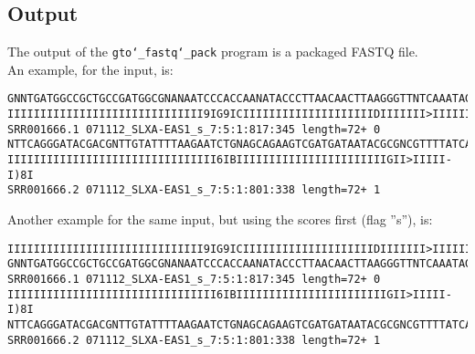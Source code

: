 \subsection*{Output}
The output of the \texttt{gto\char`_fastq\char`_pack} program is a packaged FASTQ file.\\
An example, for the input, is:
\begin{lstlisting}
GNNTGATGGCCGCTGCCGATGGCGNANAATCCCACCAANATACCCTTAACAACTTAAGGGTTNTCAAATAGA
IIIIIIIIIIIIIIIIIIIIIIIIIIIIII9IG9ICIIIIIIIIIIIIIIIIIIIIDIIIIIII>IIIIII/
SRR001666.1 071112_SLXA-EAS1_s_7:5:1:817:345 length=72+	0
NTTCAGGGATACGACGNTTGTATTTTAAGAATCTGNAGCAGAAGTCGATGATAATACGCGNCGTTTTATCAN
IIIIIIIIIIIIIIIIIIIIIIIIIIIIIIII6IBIIIIIIIIIIIIIIIIIIIIIIIGII>IIIII-I)8I
SRR001666.2 071112_SLXA-EAS1_s_7:5:1:801:338 length=72+	1
\end{lstlisting}
Another example for the same input, but using the scores first (flag ''s''), is:
\begin{lstlisting}
IIIIIIIIIIIIIIIIIIIIIIIIIIIIII9IG9ICIIIIIIIIIIIIIIIIIIIIDIIIIIII>IIIIII/
GNNTGATGGCCGCTGCCGATGGCGNANAATCCCACCAANATACCCTTAACAACTTAAGGGTTNTCAAATAGA
SRR001666.1 071112_SLXA-EAS1_s_7:5:1:817:345 length=72+	0
IIIIIIIIIIIIIIIIIIIIIIIIIIIIIIII6IBIIIIIIIIIIIIIIIIIIIIIIIGII>IIIII-I)8I
NTTCAGGGATACGACGNTTGTATTTTAAGAATCTGNAGCAGAAGTCGATGATAATACGCGNCGTTTTATCAN
SRR001666.2 071112_SLXA-EAS1_s_7:5:1:801:338 length=72+	1
\end{lstlisting}
